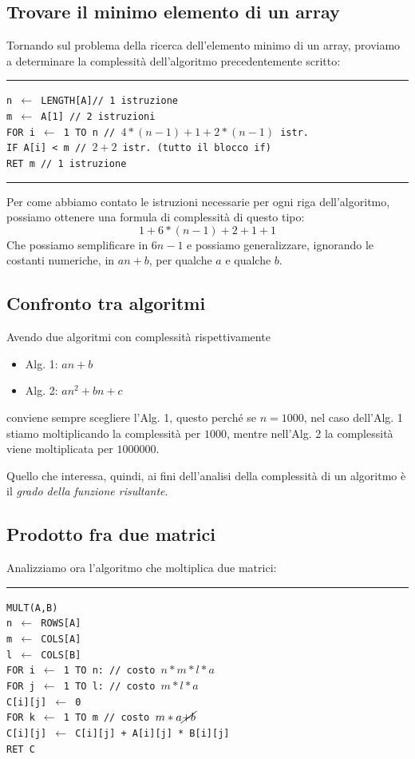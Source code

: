 \documentclass[a4paper,12pt,twoside]{report}
\newcommand\pseudo[1]{\setlength\parindent{0pt}\texttt{#1}\setlength\parindent{24pt} \\}
\newcommand\hlin{\noindent\rule[0.5ex]{\linewidth}{1pt}}
\newcommand\take[2]{#1 $\leftarrow$ #2}
\begin{document}
\subsection{Trovare il minimo elemento di un array}
Tornando sul problema della ricerca dell'elemento minimo di un array, proviamo a 
determinare la complessit\`{a} dell'algoritmo precedentemente scritto:

\hlin

\pseudo{n $\leftarrow$ LENGTH[A]\indent\indent// 1 istruzione} 
\texttt{m $\leftarrow$ A[1] \indent // 2 istruzioni \\
FOR i $\leftarrow$ 1 TO n \indent\indent // $4*(n-1)+1+2*(n-1)$ istr. \\
\indent IF A[i] < m \indent\indent // $2 + 2$ istr. (tutto il blocco if) \\
RET m \indent\indent // 1 istruzione \\
}
\hlin

Per come abbiamo contato le istruzioni necessarie per ogni riga dell'algoritmo, possiamo ottenere una formula di complessit\`{a} di questo tipo:
\[ 1+6*(n-1)+2+1+1 \]
Che possiamo semplificare in $6n-1$ e possiamo generalizzare, ignorando le costanti numeriche, in $an+b$, per qualche $a$ e qualche $b$.

\subsection{Confronto tra algoritmi}
Avendo due algoritmi con complessit\`{a} rispettivamente
\begin{itemize}
\item Alg. 1: $an+b$ 
\item Alg. 2: $an^2+bn+c$ 
\end{itemize}
conviene sempre scegliere l'Alg. 1, questo perch\'{e} se $n=1000$, nel caso dell'Alg. 1
stiamo moltiplicando la complessit\`{a} per $1000$, mentre nell'Alg. 2 la 
complessit\`{a} viene moltiplicata per $1000000$.

Quello che interessa, quindi, ai fini dell'analisi della complessit\`{a} di un 
algoritmo \`{e} il \emph{grado della funzione risultante}.

\subsection{Prodotto fra due matrici}
Analizziamo ora l'algoritmo che moltiplica due matrici:

\hlin

\pseudo{MULT(A,B)}
\texttt{\indent \take{n}{ROWS[A]} \\
\indent \take{m}{COLS[A]} \\
\indent \take{l}{COLS[B]} \\
\indent FOR \take{i}{1} TO n: \indent // costo $n*m*l*a$ \\
\indent\indent FOR \take{j}{1} TO l: \indent // costo $m*l*a$ \\
\indent\indent\indent \take{C[i][j]}{0} \\
\indent\indent\indent FOR \take{k}{1} TO m \indent // costo $m*a\cancel{+b}$ \\
\indent\indent\indent\indent \take{C[i][j]}{C[i][j] + A[i][j] * B[i][j]} \\
\indent RET C
}
\end{document}
